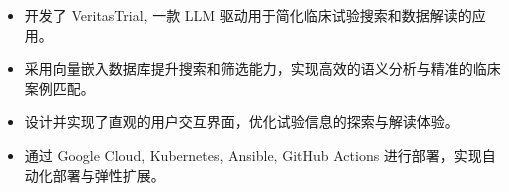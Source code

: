 


\begin{itemize}[nosep]
  \item 开发了 VeritasTrial, 一款 LLM 驱动用于简化临床试验搜索和数据解读的应用。
  \item 采用向量嵌入数据库提升搜索和筛选能力，实现高效的语义分析与精准的临床案例匹配。
  \item 设计并实现了直观的用户交互界面，优化试验信息的探索与解读体验。
  \item 通过 Google Cloud, Kubernetes, Ansible, GitHub Actions 进行部署，实现自动化部署与弹性扩展。
\end{itemize}
